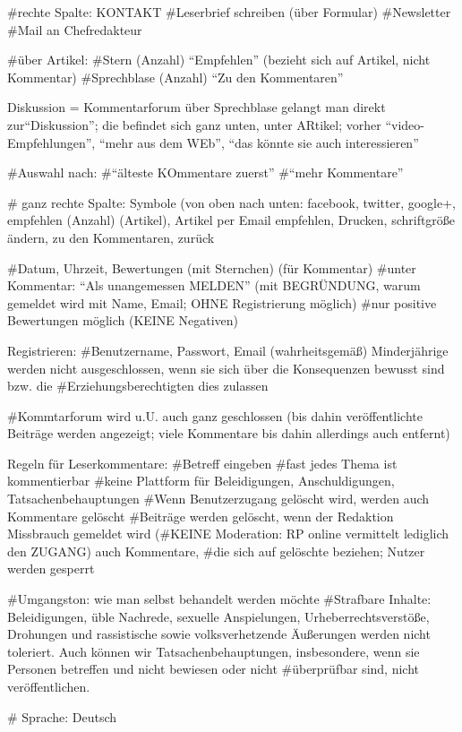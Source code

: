 #rechte Spalte: KONTAKT
	#Leserbrief schreiben (über Formular)
	#Newsletter
	#Mail an Chefredakteur 
	
#über Artikel: 
	#Stern (Anzahl) ``Empfehlen'' (bezieht sich auf Artikel, nicht Kommentar)
	#Sprechblase (Anzahl) ``Zu den Kommentaren''
	
Diskussion = Kommentarforum
über Sprechblase gelangt man direkt zur``Diskussion''; die befindet sich ganz unten, unter ARtikel; vorher ``video-Empfehlungen'', ``mehr aus dem WEb'', ``das könnte sie auch interessieren''


#Auswahl nach:
	#``älteste KOmmentare zuerst''
	#``mehr Kommentare''


# ganz rechte Spalte:  Symbole (von oben nach unten: facebook, twitter, google+, empfehlen (Anzahl) (Artikel), Artikel per Email empfehlen, Drucken, schriftgröße ändern, zu den Kommentaren, zurück


#Datum, Uhrzeit, Bewertungen (mit Sternchen) (für Kommentar)
#unter Kommentar: ``Als unangemessen MELDEN'' (mit BEGRÜNDUNG, warum gemeldet wird mit Name, Email; OHNE Registrierung möglich)
#nur positive Bewertungen möglich (KEINE Negativen)

Registrieren:
#Benutzername, Passwort, Email (wahrheitsgemäß) Minderjährige werden nicht ausgeschlossen, wenn sie sich über die Konsequenzen bewusst sind bzw. die #Erziehungsberechtigten dies zulassen

#Kommtarforum wird u.U. auch ganz geschlossen (bis dahin veröffentlichte Beiträge werden angezeigt; viele Kommentare bis dahin allerdings auch entfernt)


Regeln für Leserkommentare:
#Betreff eingeben 
#fast jedes Thema ist kommentierbar
#keine Plattform für Beleidigungen, Anschuldigungen, Tatsachenbehauptungen
#Wenn Benutzerzugang gelöscht wird, werden auch Kommentare gelöscht
#Beiträge werden gelöscht, wenn der Redaktion Missbrauch gemeldet wird (#KEINE Moderation: RP online vermittelt lediglich den ZUGANG) auch Kommentare, #die sich auf gelöschte beziehen; Nutzer werden gesperrt

#Umgangston: wie man selbst behandelt werden möchte
#Strafbare Inhalte: Beleidigungen, üble Nachrede, sexuelle Anspielungen, Urheberrechtsverstöße, Drohungen und rassistische sowie volksverhetzende Äußerungen werden nicht toleriert. Auch können wir Tatsachenbehauptungen, insbesondere, wenn sie Personen betreffen und nicht bewiesen oder nicht #überprüfbar sind, nicht veröffentlichen.
 
# Sprache: Deutsch
 

